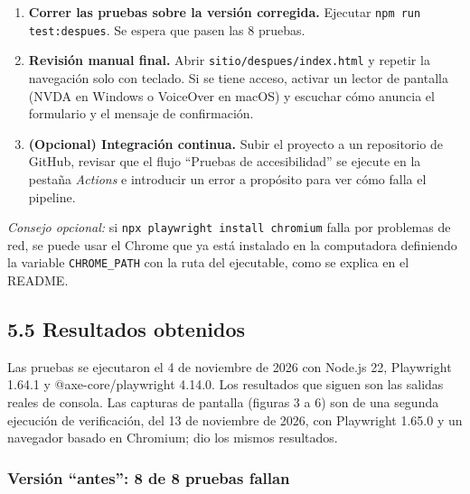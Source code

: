 \documentclass[10pt,letterpaper,onecolumn]{IEEEtran}
\begin{document}
\begin{enumerate}
\item
  \textbf{Correr las pruebas sobre la versión corregida.} Ejecutar \texttt{npm run test:\allowbreak{}despues}. Se espera que pasen las 8 pruebas.
\item
  \textbf{Revisión manual final.} Abrir \texttt{sitio/\allowbreak{}\allowbreak{}despues/\allowbreak{}\allowbreak{}index.\allowbreak{}\allowbreak{}html} y repetir la navegación solo con teclado. Si se tiene acceso, activar un lector de pantalla (NVDA en Windows o VoiceOver en macOS) y escuchar cómo anuncia el formulario y el mensaje de confirmación.
\item
  \textbf{(Opcional) Integración continua.} Subir el proyecto a un repositorio de GitHub, revisar que el flujo ``Pruebas de accesibilidad'' se ejecute en la pestaña \emph{Actions} e introducir un error a propósito para ver cómo falla el pipeline.
\end{enumerate}

\emph{Consejo opcional:} si \texttt{npx playwright install chromium} falla por problemas de red, se puede usar el Chrome que ya está instalado en la computadora definiendo la variable \texttt{CHROME\_\allowbreak{}PATH} con la ruta del ejecutable, como se explica en el README.

\subsection{5.5 Resultados obtenidos}\label{resultados-obtenidos}

Las pruebas se ejecutaron el 4 de noviembre de 2026 con Node.js 22, Playwright 1.64.1 y @axe-core/playwright 4.14.0. Los resultados que siguen son las salidas reales de consola. Las capturas de pantalla (figuras 3 a 6) son de una segunda ejecución de verificación, del 13 de noviembre de 2026, con Playwright 1.65.0 y un navegador basado en Chromium; dio los mismos resultados.

\subsubsection{Versión ``antes'': 8 de 8 pruebas fallan}\label{versiuxf3n-antes-8-de-8-pruebas-fallan}
\end{document}
